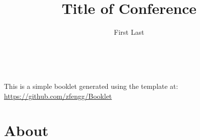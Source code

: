 \documentclass[openany,parskip=half,12pt,a4paper,table]{scrbook}
\title{Title of Conference}
\author{First Last}
\begin{document}
	
% 
\makecover

\thispagestyle{empty}
~\vfill

\begin{center}
	This is a simple booklet generated using the template at:\\ \url{https://github.com/zfengg/Booklet}
\end{center}

\newpage

\tableofcontents

\chapter{About}
\end{document}
